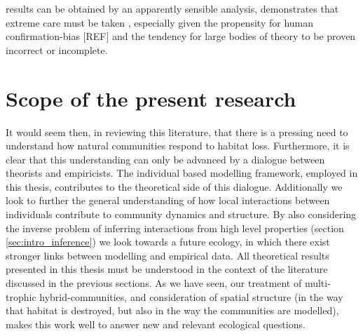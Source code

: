 results can be obtained by an apparently sensible analysis, demonstrates that extreme care must be taken , especially given the propensity for human confirmation-bias [REF] and the tendency for large bodies of theory to be proven incorrect or incomplete.     
%

\section{Scope of the present research}
\label{sec:scope}

It would seem then, in reviewing this literature, that there is a pressing need to understand how natural communities respond to habitat loss. Furthermore, it is clear that this understanding can only be advanced by a dialogue between theorists and empiricists. The individual based modelling framework, employed in this thesis, contributes to the theoretical side of this dialogue.  Additionally we look to further the general understanding of how local interactions between individuals contribute to community dynamics and structure. By also considering the inverse problem of inferring interactions from high level properties (section \ref{sec:intro_inference}) we look towards a future ecology, in which there exist stronger links between modelling and empirical data. All theoretical results presented in this thesis must be understood in the context of the literature discussed in the previous sections. As we have seen, our treatment of multi-trophic hybrid-communities, and  consideration of spatial structure (in the way that habitat is destroyed, but also in the way the communities are modelled), makes this work well  to answer new and relevant ecological questions.


